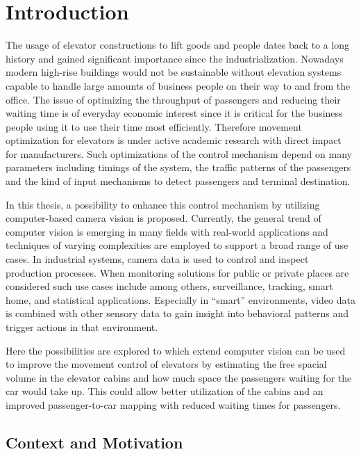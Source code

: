 \chapter{Introduction}
\label{chap:intro}

The usage of elevator constructions to lift goods and people dates back to a long history and gained significant importance since the industrialization.
Nowadays modern high-rise buildings would not be sustainable without elevation systems capable to handle large amounts of business people on their way to and from the office. 
The issue of optimizing the throughput of passengers and reducing their waiting time is of everyday economic interest since it is critical for the business people using it to use their time most efficiently. 
Therefore movement optimization for elevators is under active academic research with direct impact for manufacturers.
Such optimizations of the control mechanism depend on many parameters including timings of the system, the traffic patterns of the passengers and the kind of input mechanisms to detect passengers and terminal destination.

In this thesis, a possibility to enhance this control mechanism by utilizing computer-based camera vision is proposed.
Currently, the general trend of computer vision is emerging in many fields with real-world applications
and techniques of varying complexities are employed to support a broad range of use cases. 
In industrial systems, camera data is used to control and inspect production processes. 
When monitoring solutions for public or private places are considered such use cases include among others, surveillance, tracking,
smart home, and statistical applications.
Especially in \enquote{smart} environments, video data is combined with other sensory data to gain insight into behavioral patterns and trigger actions in that environment.

Here the possibilities are explored to which extend
computer vision can be used to improve the movement control of elevators by estimating the free spacial volume in the elevator cabins and how much space the passengers waiting for the car would take up.
This could allow better utilization of the cabins and an improved passenger-to-car mapping with reduced waiting times for passengers.

\section{Context and Motivation}
\label{sec:into:context}

